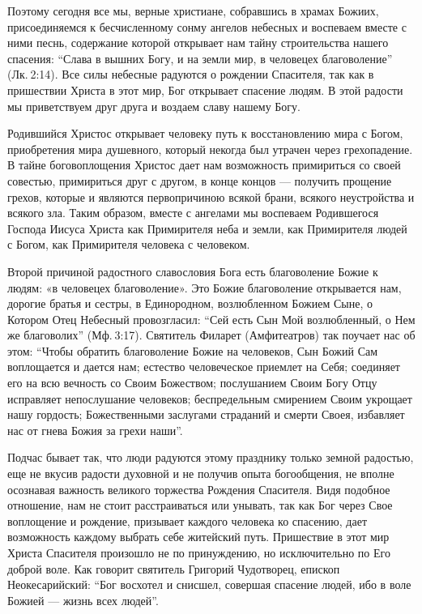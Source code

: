 Поэтому сегодня все мы, верные христиане, собравшись в храмах Божиих,
присоединяемся к бесчисленному сонму ангелов небесных и воспеваем вместе с ними
песнь, содержание которой открывает нам тайну строительства нашего спасения:
\enquote{Слава в вышних Богу, и на земли мир, в человецех благоволение} (Лк. 2:14). Все
силы небесные радуются о рождении Спасителя, так как в пришествии Христа в этот
мир, Бог открывает спасение людям. В этой радости мы приветствуем друг друга и
воздаем славу нашему Богу.

Родившийся Христос открывает человеку путь к восстановлению мира с Богом,
приобретения мира душевного, который некогда был утрачен через грехопадение. В
тайне боговоплощения Христос дает нам возможность примириться со своей
совестью, примириться друг с другом, в конце концов — получить прощение грехов,
которые и являются первопричиною всякой брани, всякого неустройства и всякого
зла. Таким образом, вместе с ангелами мы воспеваем Родившегося Господа Иисуса
Христа как Примирителя неба и земли, как Примирителя людей с Богом, как
Примирителя человека с человеком.

Второй причиной радостного славословия Бога есть благоволение Божие к людям: «в
человецех благоволение». Это Божие благоволение открывается нам, дорогие братья
и сестры, в Единородном, возлюбленном Божием Сыне, о Котором Отец Небесный
провозгласил: \enquote{Сей есть Сын Мой возлюбленный, о Нем же благоволих} (Мф. 3:17).
Святитель Филарет (Амфитеатров) так поучает нас об этом: \enquote{Чтобы обратить
благоволение Божие на человеков, Сын Божий Сам воплощается и дается нам;
естество человеческое приемлет на Себя; соединяет его на всю вечность со Своим
Божеством; послушанием Своим Богу Отцу исправляет непослушание человеков;
беспредельным смирением Своим укрощает нашу гордость; Божественными заслугами
страданий и смерти Своея, избавляет нас от гнева Божия за грехи наши}.

Подчас бывает так, что люди радуются этому празднику только земной радостью,
еще не вкусив радости духовной и не получив опыта богообщения, не вполне
осознавая важность великого торжества Рождения Спасителя. Видя подобное
отношение, нам не стоит расстраиваться или унывать, так как Бог через Свое
воплощение и рождение, призывает каждого человека ко спасению, дает возможность
каждому выбрать себе житейский путь. Пришествие в этот мир Христа Спасителя
произошло не по принуждению, но исключительно по Его доброй воле. Как говорит
святитель Григорий Чудотворец, епископ Неокесарийский: \enquote{Бог восхотел и снисшел,
совершая спасение людей, ибо в воле Божией — жизнь всех людей}.

